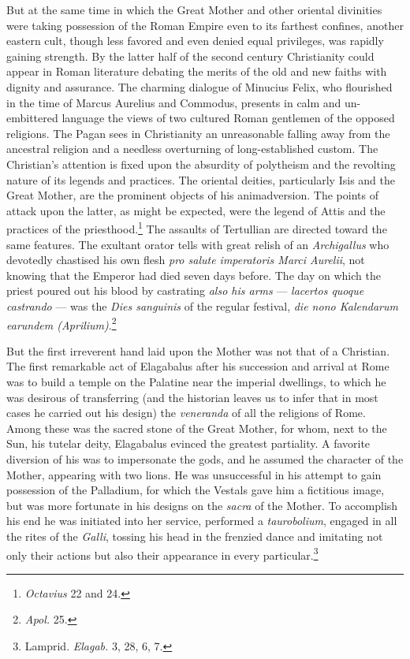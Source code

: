 \documentclass[a4paper, 11pt, oneside, polutonikogreek, english]{article}
\begin{document}
But at the same time in which the Great Mother and other oriental divinities were taking possession of the Roman Empire even to its farthest confines, another eastern cult, though less favored and even denied equal privileges, was rapidly gaining strength. By the latter half of the second century Christianity could appear in Roman literature debating the merits of the old and new faiths with dignity and assurance. The charming dialogue of Minucius Felix, who flourished in the time of Marcus Aurelius and Commodus, presents in calm and un-embittered language the views of two cultured Roman gentlemen of the opposed religions. The Pagan sees in Christianity an unreasonable falling away from the ancestral religion and a needless overturning of long-established custom. The Christian's attention is fixed upon the absurdity of polytheism and the revolting nature of its legends and practices. The oriental deities, particularly Isis and the Great Mother, are the prominent objects of his animadversion. The points of attack upon the latter, as might be expected, were the legend of Attis and the practices of the priesthood.\footnote{\emph{Octavius} 22 and 24.} The assaults of Tertullian are directed toward the same features. The exultant orator tells with great relish of an \emph{Archigallus} who devotedly chastised his own flesh \emph{pro salute imperatoris Marci Aurelii}, not knowing that the Emperor had died seven days before. The day on which the priest poured out his blood by castrating \emph{also his arms} --- \emph{lacertos quoque castrando} --- was the \emph{Dies sanguinis} of the regular festival, \emph{die nono Kalendarum earundem (Aprilium)}.\footnote{\emph{Apol.} 25.}

But the first irreverent hand laid upon the Mother was not that of a Christian. The first remarkable act of Elagabalus after his succession and arrival at Rome was to build a temple on the Palatine near the imperial dwellings, to which he was desirous of transferring (and the historian leaves us to infer that in most cases he carried out his design) the \emph{veneranda} of all the religions of Rome. Among these was the sacred stone of the Great Mother, for whom, next to the Sun, his tutelar deity, Elagabalus evinced the greatest partiality. A favorite diversion of his was to impersonate the gods, and he assumed the character of the Mother, appearing with two lions. He was unsuccessful in his attempt to gain possession of the Palladium, for which the Vestals gave him a fictitious image, but was more fortunate in his designs on the \emph{sacra} of the Mother. To accomplish his end he was initiated into her service, performed a \emph{taurobolium}, engaged in all the rites of the \emph{Galli}, tossing his head in the frenzied dance and imitating not only their actions but also their appearance in every particular.\footnote{Lamprid. \emph{Elagab.} 3, 28, 6, 7.}
\end{document}
